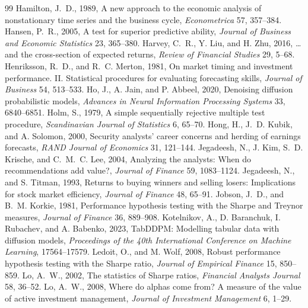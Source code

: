 \begin{thebibliography}{99}
 Hamilton, J.~D., 1989, A new approach to the economic analysis of nonstationary time series and the business cycle, \emph{Econometrica} 57, 357--384.
 Hansen, P.~R., 2005, A test for superior predictive ability, \emph{Journal of Business and Economic Statistics} 23, 365--380.
 Harvey, C.~R., Y. Liu, and H. Zhu, 2016, \ldots and the cross-section of expected returns, \emph{Review of Financial Studies} 29, 5--68.
 Henriksson, R.~D., and R.~C. Merton, 1981, On market timing and investment performance. II. Statistical procedures for evaluating forecasting skills, \emph{Journal of Business} 54, 513--533.
 Ho, J., A. Jain, and P. Abbeel, 2020, Denoising diffusion probabilistic models, \emph{Advances in Neural Information Processing Systems} 33, 6840--6851.
 Holm, S., 1979, A simple sequentially rejective multiple test procedure, \emph{Scandinavian Journal of Statistics} 6, 65--70.
 Hong, H., J.~D. Kubik, and A. Solomon, 2000, Security analysts' career concerns and herding of earnings forecasts, \emph{RAND Journal of Economics} 31, 121--144.
 Jegadeesh, N., J. Kim, S.~D. Krische, and C.~M.~C. Lee, 2004, Analyzing the analysts: When do recommendations add value?, \emph{Journal of Finance} 59, 1083--1124.
 Jegadeesh, N., and S. Titman, 1993, Returns to buying winners and selling losers: Implications for stock market efficiency, \emph{Journal of Finance} 48, 65--91.
 Jobson, J.~D., and B.~M. Korkie, 1981, Performance hypothesis testing with the Sharpe and Treynor measures, \emph{Journal of Finance} 36, 889--908.
 Kotelnikov, A., D. Baranchuk, I. Rubachev, and A. Babenko, 2023, TabDDPM: Modelling tabular data with diffusion models, \emph{Proceedings of the 40th International Conference on Machine Learning}, 17564--17579.
 Ledoit, O., and M. Wolf, 2008, Robust performance hypothesis testing with the Sharpe ratio, \emph{Journal of Empirical Finance} 15, 850--859.
 Lo, A.~W., 2002, The statistics of Sharpe ratios, \emph{Financial Analysts Journal} 58, 36--52.
 Lo, A.~W., 2008, Where do alphas come from? A measure of the value of active investment management, \emph{Journal of Investment Management} 6, 1--29.

\end{thebibliography}
